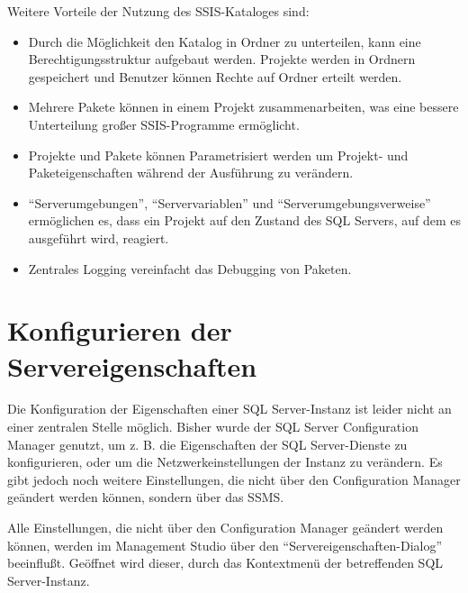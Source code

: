         Weitere Vorteile der Nutzung des SSIS-Kataloges sind:
        \begin{itemize}
            \item Durch die Möglichkeit den Katalog in Ordner zu unterteilen,
            kann eine Berechtigungsstruktur aufgebaut werden. Projekte
            werden in Ordnern gespeichert und Benutzer können Rechte auf Ordner
            erteilt werden.
            \item Mehrere Pakete können in einem Projekt zusammenarbeiten, was
            eine bessere Unterteilung großer SSIS-Programme ermöglicht.
            \item Projekte und Pakete können Parametrisiert werden um Projekt-
            und Paketeigenschaften während der Ausführung zu verändern.
            \item \enquote{Serverumgebungen}, \enquote{Servervariablen} und
            \enquote{Serverumgebungsverweise} ermöglichen es, dass ein Projekt
            auf den Zustand des SQL Servers, auf dem es ausgeführt wird,
            reagiert.
            \item Zentrales Logging vereinfacht das Debugging von Paketen.
        \end{itemize}
        \begin{literaturinternet}
          \item \cite{hh479588}
        \end{literaturinternet}          
    \section{Konfigurieren der Servereigenschaften}
      Die Konfiguration der Eigenschaften einer SQL Server-Instanz ist leider
      nicht an einer zentralen Stelle möglich. Bisher wurde der SQL Server
      Configuration Manager genutzt, um z. B. die Eigenschaften der SQL
      Server-Dienste zu konfigurieren, oder um die Netzwerkeinstellungen
      der Instanz zu verändern. Es gibt jedoch noch weitere Einstellungen, die
      nicht über den Configuration Manager geändert werden können, sondern
      über das SSMS.
      
      Alle Einstellungen, die nicht über den Configuration Manager geändert
      werden können, werden im Management Studio über den
      \enquote{Servereigenschaften-Dialog} beeinflußt. Geöffnet wird dieser,
      durch das Kontextmenü der betreffenden SQL Server-Instanz.
